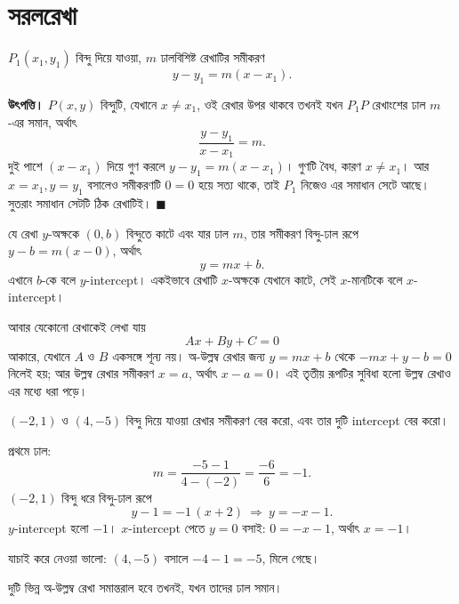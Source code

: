 \documentclass[11pt]{article}
\begin{document}
\section{সরলরেখা}

\begin{idea}[বিন্দু-ঢাল রূপ]
$P_1(x_1, y_1)$ বিন্দু দিয়ে যাওয়া, $m$ ঢালবিশিষ্ট রেখাটির সমীকরণ
\[
  y - y_1 = m (x - x_1).
\]
\end{idea}

\noindent
\textbf{উৎপত্তি।} $P(x,y)$ বিন্দুটি, যেখানে $x \neq x_1$, ওই রেখার উপর
থাকবে তখনই যখন $P_1 P$ রেখাংশের ঢাল $m$-এর সমান, অর্থাৎ
\[
  \frac{y - y_1}{x - x_1} = m .
\]
দুই পাশে $(x - x_1)$ দিয়ে গুণ করলে $y - y_1 = m(x - x_1)$। গুণটি বৈধ, কারণ
$x \neq x_1$। আর $x = x_1, y = y_1$ বসালেও সমীকরণটি $0 = 0$ হয়ে সত্য থাকে,
তাই $P_1$ নিজেও এর সমাধান সেটে আছে। সুতরাং সমাধান সেটটি ঠিক রেখাটিই।
$\blacksquare$

\begin{idea}[ঢাল-ছেদক রূপ ও সাধারণ রূপ]
যে রেখা $y$-অক্ষকে $(0, b)$ বিন্দুতে কাটে এবং যার ঢাল $m$, তার সমীকরণ
বিন্দু-ঢাল রূপে $y - b = m(x - 0)$, অর্থাৎ
\[
  y = mx + b .
\]
এখানে $b$-কে বলে $y$-intercept। একইভাবে রেখাটি $x$-অক্ষকে যেখানে কাটে, সেই
$x$-মানটিকে বলে $x$-intercept।

আবার যেকোনো রেখাকেই লেখা যায়
\[
  Ax + By + C = 0
\]
আকারে, যেখানে $A$ ও $B$ একসঙ্গে শূন্য নয়। অ-উল্লম্ব রেখার জন্য
$y = mx + b$ থেকে $-mx + y - b = 0$ নিলেই হয়; আর উল্লম্ব রেখার সমীকরণ
$x = a$, অর্থাৎ $x - a = 0$। এই তৃতীয় রূপটির সুবিধা হলো উল্লম্ব রেখাও এর
মধ্যে ধরা পড়ে।
\end{idea}

\begin{example}
$(-2, 1)$ ও $(4, -5)$ বিন্দু দিয়ে যাওয়া রেখার সমীকরণ বের করো, এবং তার দুটি
intercept বের করো।
\end{example}

\begin{solbox}
প্রথমে ঢাল:
\[
  m = \frac{-5 - 1}{4 - (-2)} = \frac{-6}{6} = -1 .
\]
$(-2, 1)$ বিন্দু ধরে বিন্দু-ঢাল রূপে
\[
  y - 1 = -1\,(x + 2) \ \Longrightarrow\ y = -x - 1 .
\]
$y$-intercept হলো $-1$। $x$-intercept পেতে $y = 0$ বসাই: $0 = -x - 1$,
অর্থাৎ $x = -1$।

যাচাই করে নেওয়া ভালো: $(4, -5)$ বসালে $-4 - 1 = -5$, মিলে গেছে।
\end{solbox}

\begin{idea}[সমান্তরালের শর্ত]
দুটি ভিন্ন অ-উল্লম্ব রেখা সমান্তরাল হবে তখনই, যখন তাদের ঢাল সমান।
\end{idea}
\end{document}
